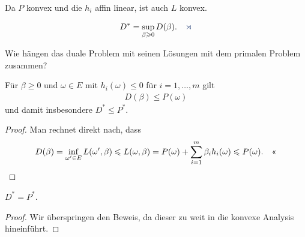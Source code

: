 Da $P$ konvex und die $h_i$ affin linear, ist auch $L$ konvex.

\begin{defn*}
\begin{align*}
D^* = \sup_{\beta\ge 0} D(\beta).\fishhere
\end{align*}
\end{defn*} 

Wie hängen das duale Problem mit seinen Lösungen mit dem primalen Problem
zusammen?

\begin{lem*}
Für $\beta \ge 0$ und $\omega\in E$ mit $h_i(\omega)\le 0$ für $i=1,\ldots,m$
gilt
\begin{align*}
D(\beta) \le P(\omega)
\end{align*}
und damit insbesondere $D^*\le P^*$.\fishhere
\end{lem*}
\begin{proof}
Man rechnet direkt nach, dass
\begin{align*}
D(\beta) = \inf_{\omega'\in E} L(\omega',\beta) \le
L(\omega,\beta) = P(\omega) + \sum_{i=1}^m \beta_i h_i(\omega) \le
P(\omega).\qedhere
\end{align*}
\end{proof}

\begin{prop*}
$D^*=P^*$.\fishhere
\end{prop*}
\begin{proof}
Wir überspringen den Beweis, da dieser zu weit in die konvexe Analysis
hineinführt.\qedhere
\end{proof}


